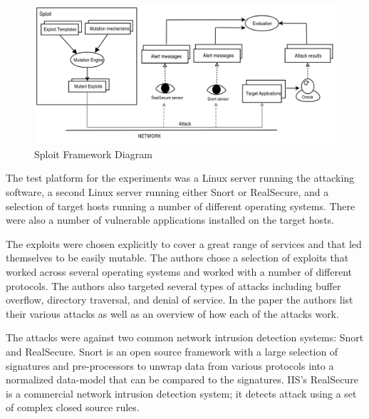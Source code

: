 \documentclass{reading_glasses}
\begin{document}
\begin{figure}
	\centering
	\includegraphics[width=1.0\textwidth]{SploitFramework.png}
	\caption{Sploit Framework Diagram}
	\label{fig:sploitF}
\end{figure}

The test platform for the experiments was a Linux server running the attacking software, a second Linux server running either Snort or RealSecure, and a selection of target hosts running a number of different operating systems.  There were also a number of vulnerable applications installed on the target hosts. \cite{vigna2004testing}

The exploits were chosen explicitly to cover a great range of services and that led themselves to be easily mutable.  The authors chose a selection of exploits that worked across several operating systems and worked with a number of different protocols.  The authors also targeted several types of attacks including buffer overflow, directory traversal, and denial of service.  In the paper the authors list their various attacks as well as an overview of how each of the attacks work. \cite{vigna2004testing}

The attacks were against two common network intrusion detection systems: Snort and RealSecure.  Snort is an open source framework with a large selection of signatures and pre-processors to unwrap data from various protocols into a normalized data-model that can be compared to the signatures.  IIS's RealSecure is a commercial network intrusion detection system; it detects attack using a set of complex closed source rules.\cite{vigna2004testing}
\end{document}
